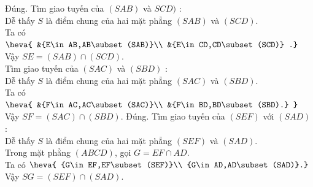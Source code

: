 \begin{ex}
{\begin{itemchoice}
\begin{center}
			\end{center}
			\itemch Đúng. Tìm giao tuyến của $ (SAB)$ và $ SCD)$ :\\
			Dễ thấy $ S$ là điểm chung của hai mặt phẳng $ (SAB)$ và $ (SCD)$.\\
			Ta có $\heva{
					&{E\in AB,AB\subset (SAB)}\\
					&{E\in CD,CD\subset (SCD)}
				.}$\\
			Vậy $ SE=(SAB)\cap (SCD)$.\\
			Tìm giao tuyến của $ (SAC)$ và $ (SBD)$ :\\
			Dễ thấy $ S$ là điểm chung của hai mặt phẳng $ (SAC)$ và $ (SBD)$.\\
			Ta có $\heva{
					&{F\in AC,AC\subset (SAC)}\\
				    &{F\in BD,BD\subset (SBD).}
				}$\\
			Vậy $ SF=(SAC)\cap (SBD)$.
			\itemch Đúng. Tìm giao tuyến của $ (SEF)$ với $ (SAD)$ :\\
			Dễ thấy $ S$ là điểm chung của hai mặt phẳng $ (SEF)$ và $ (SAD)$.\\
			Trong mặt phẳng $ (ABCD)$, gọi $ G=EF\cap AD$.\\
			Ta có $ \heva{
					{G\in EF,EF\subset (SEF)}\\
					{G\in AD,AD\subset (SAD)}.}$\\
			Vậy $SG=(SEF)\cap (SAD)$.
		\end{itemchoice}
	}
\end{ex}

